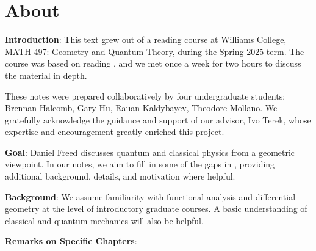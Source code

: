 \newpage 

\section*{About}

\textbf{Introduction}: This text grew out of a reading course at Williams College, MATH 497: Geometry and Quantum Theory, during the Spring 2025 term. The course was based on reading \cite{freed}, and we met once a week for two hours to discuss the material in depth.

These notes were prepared collaboratively by four undergraduate students: Brennan Halcomb, Gary Hu, Rauan Kaldybayev, Theodore Mollano. We gratefully acknowledge the guidance and support of our advisor, Ivo Terek, whose expertise and encouragement greatly enriched this project.

\textbf{Goal}: Daniel Freed discusses quantum and classical physics from a geometric viewpoint. In our notes, we aim to fill in some of the gaps in \cite{freed}, providing additional background, details, and motivation where helpful.

\textbf{Background}: We assume familiarity with functional analysis and differential geometry at the level of introductory graduate courses. A basic understanding of classical and quantum mechanics will also be helpful.

\textbf{Remarks on Specific Chapters}:

